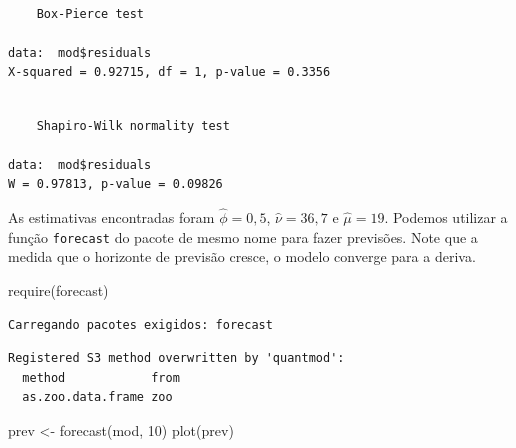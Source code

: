 \documentclass[
  letterpaper,
  DIV=11,
  numbers=noendperiod]{scrartcl}
\newenvironment{Shaded}{\begin{snugshade}}{\end{snugshade}}
\newcommand{\DecValTok}[1]{\textcolor[rgb]{0.68,0.00,0.00}{#1}}
\newcommand{\FunctionTok}[1]{\textcolor[rgb]{0.28,0.35,0.67}{#1}}
\newcommand{\NormalTok}[1]{\textcolor[rgb]{0.00,0.23,0.31}{#1}}
\newcommand{\OtherTok}[1]{\textcolor[rgb]{0.00,0.23,0.31}{#1}}
\newcommand{\SpecialCharTok}[1]{\textcolor[rgb]{0.37,0.37,0.37}{#1}}
\theoremstyle{definition}
\theoremstyle{definition}
\theoremstyle{plain}
\theoremstyle{plain}
\theoremstyle{remark}
\begin{document}
\begin{Shaded}
\end{Shaded}

\begin{verbatim}

    Box-Pierce test

data:  mod$residuals
X-squared = 0.92715, df = 1, p-value = 0.3356
\end{verbatim}

\begin{Shaded}
\end{Shaded}

\begin{verbatim}

    Shapiro-Wilk normality test

data:  mod$residuals
W = 0.97813, p-value = 0.09826
\end{verbatim}

As estimativas encontradas foram \(\hat{\phi}=0,5\), \(\hat{\nu}=36,7\)
e \(\hat{\mu}=19\). Podemos utilizar a função \texttt{forecast} do
pacote de mesmo nome para fazer previsões. Note que a medida que o
horizonte de previsão cresce, o modelo converge para a deriva.

\begin{Shaded}
\begin{Highlighting}[]
\FunctionTok{require}\NormalTok{(forecast)}
\end{Highlighting}
\end{Shaded}

\begin{verbatim}
Carregando pacotes exigidos: forecast
\end{verbatim}

\begin{verbatim}
Registered S3 method overwritten by 'quantmod':
  method            from
  as.zoo.data.frame zoo 
\end{verbatim}

\begin{Shaded}
\begin{Highlighting}[]
\NormalTok{prev }\OtherTok{\textless{}{-}} \FunctionTok{forecast}\NormalTok{(mod, }\DecValTok{10}\NormalTok{)}
\FunctionTok{plot}\NormalTok{(prev)}
\end{Highlighting}
\end{Shaded}
\end{document}
